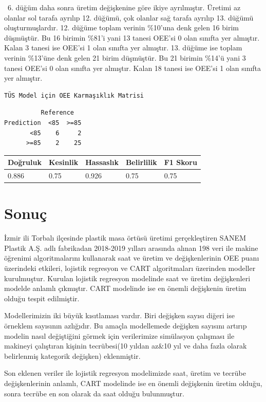 \documentclass[12pt,twoside]{deuthesis}
\begin{document}
~6. düğüm daha sonra üretim değişkenine göre ikiye ayrılmıştır. Üretimi az olanlar sol tarafa ayrılıp 12. düğümü, çok olanlar sağ tarafa ayrılıp 13. düğümü oluşturmuşlardır. 12. düğüme toplam verinin \%10'una denk gelen 16 birim düşmüştür. Bu 16 birimin \%81'i yani 13 tanesi OEE'si 0 olan sınıfta yer almıştır. Kalan 3 tanesi ise OEE'si 1 olan sınıfta yer almıştır. 13. düğüme ise toplam verinin \%13'üne denk gelen 21 birim düşmüştür. Bu 21 birimin \%14'ü yani 3 tanesi OEE'si 0 olan sınıfta yer almıştır. Kalan 18 tanesi ise OEE'si 1 olan sınıfta yer almıştır.
\begin{verbatim}
TÜS Model için OEE Karmaşıklık Matrisi 
\end{verbatim}
\begin{verbatim}
          Reference
Prediction  <85  >=85
       <85    6     2
      >=85    2    25
\end{verbatim}
\begin{longtable}[]{@{}lllll@{}}
\toprule
Doğruluk & Kesinlik & Hassaslık & Belirlilik & F1 Skoru\tabularnewline
\midrule
\endhead
0.886 & 0.75 & 0.926 & 0.75 & 0.75\tabularnewline
\bottomrule
\end{longtable}
\hypertarget{sonuuxe7}{%
\chapter*{Sonuç}\label{sonuuxe7}}

İzmir ili Torbalı ilçesinde plastik masa örtüsü üretimi gerçekleştiren SANEM Plastik A.Ş. adlı fabrikadan 2018-2019 yılları arasında alınan 198 veri ile makine öğrenimi algoritmalarını kullanarak saat ve üretim ve değişkenlerinin OEE puanı üzerindeki etkileri, lojistik regresyon ve CART algoritmaları üzerinden modeller kurulmuştur. Kurulan lojistik regresyon modelinde saat ve üretim değişkenleri modelde anlamlı çıkmıştır. CART modelinde ise en önemli değişkenin üretim olduğu tespit edilmiştir.

Modellerimizin iki büyük kısıtlaması vardır. Biri değişken sayısı diğeri ise örneklem sayısının azlığıdır. Bu amaçla modellemede değişken sayısını artırıp modelin nasıl değiştiğini görmek için verilerimize simülasyon çalışması ile makineyi çalıştıran kişinin tecrübesi(10 yıldan az\&10 yıl ve daha fazla olarak belirlenmiş kategorik değişken) eklenmiştir.

Son eklenen veriler ile lojistik regresyon modelimizde saat, üretim ve tecrübe değişkenlerinin anlamlı, CART modelinde ise en önemli değişkenin üretim olduğu, sonra tecrübe en son olarak da saat olduğu bulunmuştur.
\end{document}
